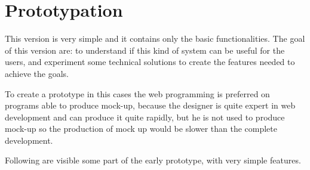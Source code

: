 \section{Prototypation}

This version is very simple and it contains only the basic functionalities. 
The goal of this version are: to understand if this kind of system can be useful for the users, and experiment some technical solutions to create the features needed to achieve the goals. 

To create a prototype in this cases the web programming is preferred on programs able to produce mock-up, because the designer is quite expert in web development
and can produce it quite rapidly, but he is not used to produce mock-up so the production of mock up would be slower than the complete development. 


Following are visible some part of the early prototype, with very simple features.

